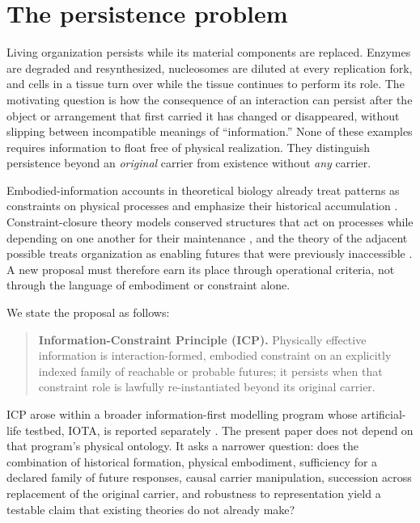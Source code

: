 \section{The persistence problem}

Living organization persists while its material components are replaced.
Enzymes are degraded and resynthesized, nucleosomes are diluted at every
replication fork, and cells in a tissue turn over while the tissue continues to
perform its role. The motivating question is how the consequence of an
interaction can persist after the object or arrangement that first carried it
has changed or disappeared, without slipping between incompatible meanings of
``information.'' None of these examples requires information to float free of
physical realization. They distinguish persistence beyond an \emph{original}
carrier from existence without \emph{any} carrier.

Embodied-information accounts in theoretical biology already treat patterns as
constraints on physical processes and emphasize their historical accumulation
\citep{Farnsworth2022Information}. Constraint-closure theory models conserved
structures that act on processes while depending on one another for their
maintenance \citep{MontevilMossio2015Closure}, and the theory of the adjacent
possible treats organization as enabling futures that were previously
inaccessible \citep{Kauffman2000Investigations,Kauffman2014Prolegomenon}. A new
proposal must therefore earn its place through operational criteria, not
through the language of embodiment or constraint alone.

We state the proposal as follows:
\begin{quote}
\textbf{Information-Constraint Principle (ICP).} Physically effective
information is interaction-formed, embodied constraint on an explicitly indexed
family of reachable or probable futures; it persists when that constraint role
is lawfully re-instantiated beyond its original carrier.
\end{quote}
ICP arose within a broader information-first modelling program whose
artificial-life testbed, IOTA, is reported separately
\citep{Clark2026IotaConstraint}. The present paper does not depend on that
program's physical ontology. It asks a narrower question: does the combination
of historical formation, physical embodiment, sufficiency for a declared
family of future responses, causal carrier manipulation, succession across
replacement of the original carrier, and robustness to representation yield a
testable claim that existing theories do not already make?

